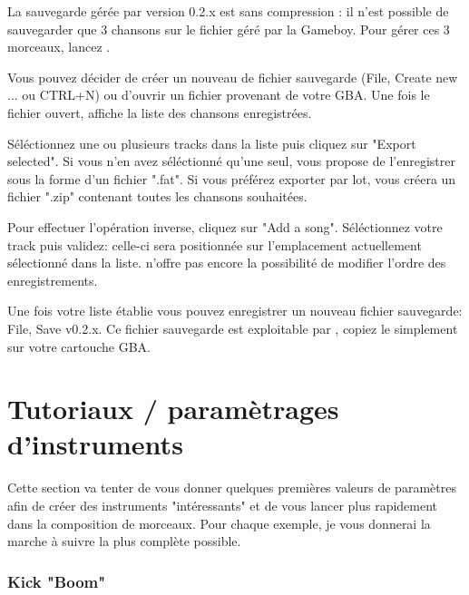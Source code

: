 \documentclass[12pt,a4paper]{article}
\begin{document}
    La sauvegarde gérée par \FAT version 0.2.x est sans compression : il n'est possible de sauvegarder que 3 chansons sur le fichier géré par la Gameboy. Pour gérer ces 3 morceaux, lancez \BURGER.
    
    
    Vous pouvez décider de créer un nouveau de fichier sauvegarde (File, Create new ... ou CTRL+N)  ou d'ouvrir un fichier provenant de votre GBA. Une fois le fichier ouvert, \BURGER affiche la liste des chansons enregistrées.
    
    
    Séléctionnez une ou plusieurs tracks dans la liste puis cliquez sur "Export selected". Si vous n'en avez séléctionné qu'une seul, \BURGER vous propose de l'enregistrer sous la forme d'un fichier ".fat". Si vous préférez exporter par lot, \BURGER vous créera un fichier ".zip" contenant toutes les chansons souhaitées.\medskip
    
    Pour effectuer l'opération inverse, cliquez sur "Add a song". Séléctionnez votre track puis validez: celle-ci sera positionnée sur l'emplacement actuellement sélectionné dans la liste. \BURGER n'offre pas encore la possibilité de modifier l'ordre des enregistrements.\medskip
    
    Une fois votre liste établie vous pouvez enregistrer un nouveau fichier sauvegarde: File, Save v0.2.x. Ce fichier sauvegarde est exploitable par \FAT, copiez le simplement sur votre cartouche GBA.
  
  \section{Tutoriaux / paramètrages d'instruments}
  
  Cette section va tenter de vous donner quelques premières valeurs de paramètres afin de créer des instruments "intéressants" et de vous lancer plus rapidement dans la composition de morceaux. Pour chaque exemple, je vous donnerai la marche à suivre la plus complète possible.
  
    \subsubsection{Kick "Boom"}
    
\end{document}
